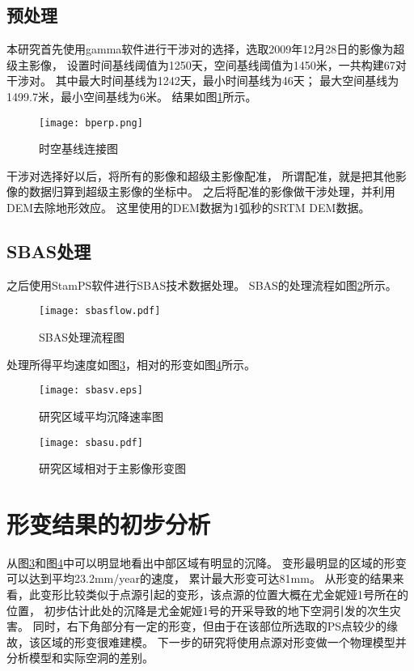 \subsection{预处理}
本研究首先使用gamma软件进行干涉对的选择，选取2009年12月28日的影像为超级主影像，
设置时间基线阈值为1250天，空间基线阈值为1450米，一共构建67对干涉对。
其中最大时间基线为1242天，最小时间基线为46天；
最大空间基线为1499.7米，最小空间基线为6米。
结果如图\ref{fig:bprep}所示。
\begin{figure}[htb]
    \centering
    \texttt{[image: bperp.png]}
    \caption{时空基线连接图}
    \label{fig:bprep}
\end{figure}

干涉对选择好以后，将所有的影像和超级主影像配准，
所谓配准，就是把其他影像的数据归算到超级主影像的坐标中。
之后将配准的影像做干涉处理，并利用DEM去除地形效应。
这里使用的DEM数据为1弧秒的SRTM DEM数据。

\subsection{SBAS处理}
之后使用StamPS软件进行SBAS技术数据处理。
SBAS的处理流程如图\ref{fig:sbasflow}所示。
\begin{figure}[htb]
    \centering
    \texttt{[image: sbasflow.pdf]}
    \caption{SBAS处理流程图}
    \label{fig:sbasflow}
\end{figure}

处理所得平均速度如图\ref{fig:sbasv}，相对的形变如图\ref{fig:sbasu}所示。
\begin{figure}[htb]
    \centering
    \texttt{[image: sbasv.eps]}
    \caption{研究区域平均沉降速率图}
    \label{fig:sbasv}
\end{figure}
\begin{figure}[htb]
    \centering
    \texttt{[image: sbasu.pdf]}
    \caption{研究区域相对于主影像形变图}
    \label{fig:sbasu}
\end{figure}

\section{形变结果的初步分析}
从图\ref{fig:sbasv}和图\ref{fig:sbasu}中可以明显地看出中部区域有明显的沉降。
变形最明显的区域的形变可以达到平均23.2mm/year的速度，
累计最大形变可达81mm。
从形变的结果来看，此变形比较类似于点源引起的变形，该点源的位置大概在尤金妮娅1号所在的位置，
初步估计此处的沉降是尤金妮娅1号的开采导致的地下空洞引发的次生灾害。
同时，右下角部分有一定的形变，但由于在该部位所选取的PS点较少的缘故，该区域的形变很难建模。
下一步的研究将使用点源对形变做一个物理模型并分析模型和实际空洞的差别。